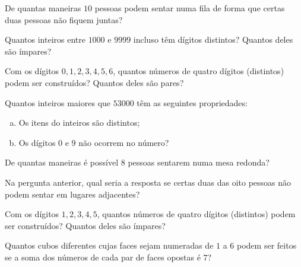 \begin{exercise}
	De quantas maneiras $10$ pessoas podem sentar numa fila de forma que certas duas pessoas não fiquem juntas?
\end{exercise}

\begin{exercise}
	Quantos inteiros entre $1000$ e $9999$ incluso têm dígitos distintos? Quantos deles são ímpares?
\end{exercise}

\begin{exercise}
	Com os dígitos $0, 1, 2, 3, 4, 5, 6$, quantos números de quatro dígitos (distintos) podem ser construídos? Quantos deles são pares?
\end{exercise}

\begin{exercise}
	Quantos inteiros maiores que $53000$ têm as seguintes propriedades:
	\begin{enumerate}[(a)]
		\item Os itens do inteiros são distintos;
		\item Os dígitos $0$ e $9$ não ocorrem no número?
	\end{enumerate}
\end{exercise}

\begin{homework}
	De quantas maneiras é possível $8$ pessoas sentarem numa mesa redonda?
\end{homework}

\begin{homework}
	Na pergunta anterior, qual seria a resposta se certas duas das oito pessoas não podem sentar em lugares adjacentes?
\end{homework}

\begin{homework}
	Com os dígitos $1,2,3,4,5$, quantos números de quatro dígitos (distintos) podem ser construídos? Quantos deles são ímpares?	
\end{homework}

\begin{homework}
	Quantos cubos diferentes cujas faces sejam numeradas de $1$ a $6$ podem ser feitos se a soma dos números de cada par de faces opostas é $7$?
\end{homework}
